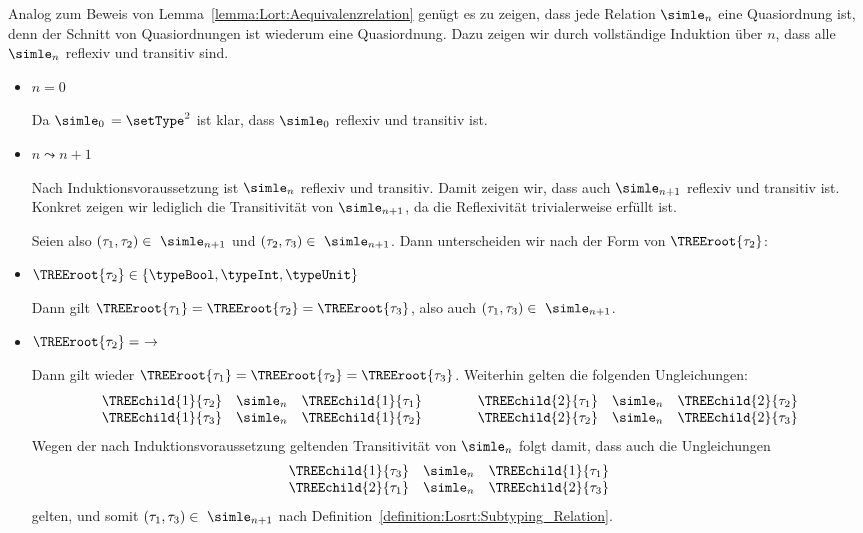 \begin{beweis}
  Analog zum Beweis von Lemma~\ref{lemma:Lort:Aequivalenzrelation} gen\"ugt es zu zeigen, dass jede Relation
  $\simle_n$ eine Quasiordnung ist, denn der Schnitt von Quasiordnungen ist wiederum eine Quasiordnung. Dazu
  zeigen wir durch vollst\"andige Induktion \"uber $n$, dass alle $\simle_n$ reflexiv und transitiv sind.
  \begin{itemize}
    \item $n = 0$

          Da $\simle_0\,=\setType^2$ ist klar, dass $\simle_0$ reflexiv und transitiv ist.

    \item $n \leadsto n+1$

          Nach Induktionsvoraussetzung ist $\simle_n$ reflexiv und transitiv. Damit zeigen wir, dass auch
          $\simle_{n+1}$ reflexiv und transitiv ist. Konkret zeigen wir lediglich die Transitivit\"at von
          $\simle_{n+1}$, da die Reflexivit\"at trivialerweise erf\"ullt ist.

          Seien also $(\tau_1,\tau_2)\in\ \simle_{n+1}$ und $(\tau_2,\tau_3)\in\ \simle_{n+1}$. Dann unterscheiden
          wir nach der Form von $\TREEroot{\tau_2}$:
          \PROOFCASEbeg
            \item $\TREEroot{\tau_2} \in \{\typeBool,\typeInt,\typeUnit\}$

                  Dann gilt $\TREEroot{\tau_1} = \TREEroot{\tau_2} = \TREEroot{\tau_3}$, also auch
                  $(\tau_1,\tau_3)\in\ \simle_{n+1}$.

            \item $\TREEroot{\tau_2} =\ \to$

                  Dann gilt wieder $\TREEroot{\tau_1} = \TREEroot{\tau_2} = \TREEroot{\tau_3}$. Weiterhin gelten
                  die folgenden Ungleichungen:
                  \[\begin{array}{rclcrcl}
                    \TREEchild{1}{\tau_2} & \simle_n & \TREEchild{1}{\tau_1}
                    & \quad \quad &
                    \TREEchild{2}{\tau_1} & \simle_n & \TREEchild{2}{\tau_2} \\
                    \TREEchild{1}{\tau_3} & \simle_n & \TREEchild{1}{\tau_2}
                    & \quad \quad &
                    \TREEchild{2}{\tau_2} & \simle_n & \TREEchild{2}{\tau_3}
                  \end{array}\]
                  Wegen der nach Induktionsvoraussetzung geltenden Transitivit\"at von $\simle_n$ folgt damit,
                  dass auch die Ungleichungen
                  \[\begin{array}{rcl}
                    \TREEchild{1}{\tau_3} & \simle_n & \TREEchild{1}{\tau_1} \\
                    \TREEchild{2}{\tau_1} & \simle_n & \TREEchild{2}{\tau_3}
                  \end{array}\]
                  gelten, und somit $(\tau_1,\tau_3)\in\ \simle_{n+1}$ nach Definition~\ref{definition:Losrt:Subtyping_Relation}.


\end{itemize}
\end{beweis}
